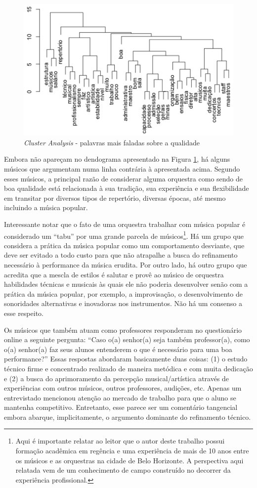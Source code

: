 \documentclass[a4paper, 12pt, openright, oneside, german, french, english, brazil]{abntex2}
\begin{document}
	\begin{figure}[!ht]
		\centering
		\caption{\textit{Cluster Analysis} - palavras mais faladas sobre a qualidade}
		\label{cluster}
		\includegraphics[scale=.8]{qualidade_cluster.png}
	\end{figure}
	
	Embora não apareçam no dendograma apresentado na Figura \ref{cluster}, há alguns músicos que argumentam numa linha contrária à apresentada acima. Segundo esses músicos, a principal razão de considerar alguma orquestra como sendo de boa qualidade está relacionada à sua tradição, sua experiência e sua flexibilidade em transitar por diversos tipos de repertório, diversas épocas, até mesmo incluindo a música popular.
	
	Interessante notar que o fato de uma orquestra trabalhar com música popular é considerado um ``tabu'' por uma grande parcela de músicos\footnote{Aqui é importante relatar ao leitor que o autor deste trabalho possui formação acadêmica em regência e uma experiência de mais de 10 anos entre os músicos e as orquestras na cidade de Belo Horizonte. A perspectiva aqui relatada vem de um conhecimento de campo construído no decorrer da experiência profissional.}. Há um grupo que considera a prática da música popular como um comportamento desviante, que deve ser evitado a todo custo para que não atrapalhe a busca do refinamento necessário à performance da música erudita. Por outro lado, há outro grupo que acredita que a mescla de estilos é salutar e provê ao músico de orquestra habilidades técnicas e musicais às quais ele não poderia desenvolver senão com a prática da música popular, por exemplo, a improvisação, o desenvolvimento de sonoridades alternativas e inovadoras nos instrumentos. Não há um consenso a esse respeito.
	
	Os músicos que também atuam como professores responderam no questionário online a seguinte pergunta: ``Caso o(a) senhor(a) seja também professor(a), como o(a) senhor(a) faz seus alunos entenderem o que é necessário para uma boa performance?'' Essas respostas abordaram basicamente duas coisas: (1) o estudo técnico firme e concentrado realizado de maneira metódica e com muita dedicação e (2) a busca do aprimoramento da percepção musical/artística através de experiências com outros músicos, outros professores, audições, etc. Apenas um entrevistado mencionou atenção ao mercado de trabalho para que o aluno se mantenha competitivo. Entretanto, esse parece ser um comentário tangencial embora abarque, implicitamente, o argumento dominante do refinamento técnico.
	
\end{document}
